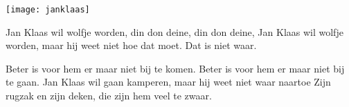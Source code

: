 \begin{intersong}
    \texttt{[image: janklaas]}
\end{intersong}
\beginverse
Jan Klaas wil wolfje worden,
din don deine, din don deine,
Jan Klaas wil wolfje worden,
maar hij weet niet hoe dat moet.
\endverse
\beginchorus
Dat is niet waar.

Beter is voor hem 
er maar niet bij te komen.
Beter is voor hem 
er maar niet bij te gaan.
\endchorus
\beginverse
Jan Klaas wil gaan kamperen,
maar hij weet niet waar naartoe
Zijn rugzak en zijn deken,
die zijn hem veel te zwaar.
\endverse
\endsong